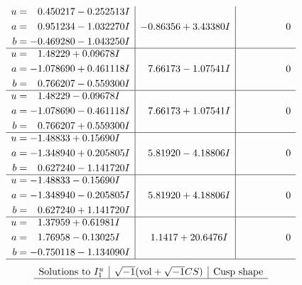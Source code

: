 \documentclass[1p]{elsarticle_modified}
\theoremstyle{definition}
\newcommand{\I}{\sqrt{-1}}
\begin{document}
$$\begin{array}{c|c|c}
\begin{aligned}
u &= \phantom{-}0.450217 - 0.252513 I \\
a &= \phantom{-}0.951234 - 1.032270 I \\
b &= -0.469280 - 1.043250 I\end{aligned}
 & -0.86356 + 3.43380 I & \phantom{-0.000000 } 0 \\ \hline\begin{aligned}
u &= \phantom{-}1.48229 + 0.09678 I \\
a &= -1.078690 + 0.461118 I \\
b &= \phantom{-}0.766207 - 0.559300 I\end{aligned}
 & \phantom{-}7.66173 - 1.07541 I & \phantom{-0.000000 } 0 \\ \hline\begin{aligned}
u &= \phantom{-}1.48229 - 0.09678 I \\
a &= -1.078690 - 0.461118 I \\
b &= \phantom{-}0.766207 + 0.559300 I\end{aligned}
 & \phantom{-}7.66173 + 1.07541 I & \phantom{-0.000000 } 0 \\ \hline\begin{aligned}
u &= -1.48833 + 0.15690 I \\
a &= -1.348940 + 0.205805 I \\
b &= \phantom{-}0.627240 - 1.141720 I\end{aligned}
 & \phantom{-}5.81920 - 4.18806 I & \phantom{-0.000000 } 0 \\ \hline\begin{aligned}
u &= -1.48833 - 0.15690 I \\
a &= -1.348940 - 0.205805 I \\
b &= \phantom{-}0.627240 + 1.141720 I\end{aligned}
 & \phantom{-}5.81920 + 4.18806 I & \phantom{-0.000000 } 0 \\ \hline\begin{aligned}
u &= \phantom{-}1.37959 + 0.61981 I \\
a &= \phantom{-}1.76958 - 0.13025 I \\
b &= -0.750118 - 1.134090 I\end{aligned}
 & \phantom{-}1.1417 + 20.6476 I & \phantom{-0.000000 } 0\\
 \hline 
 \end{array}$$\newpage$$\begin{array}{c|c|c}  
\text{Solutions to }I^u_{1}& \I (\text{vol} + \sqrt{-1}CS) & \text{Cusp shape}\\
 \hline 

\end{array}$$
\end{document}
